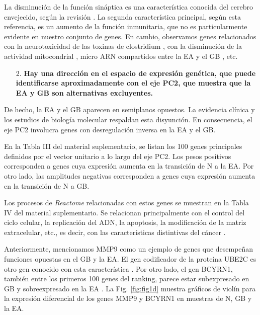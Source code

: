 La disminución de la función sináptica es una característica conocida del cerebro envejecido, según la revisión \cite{Ham_2020}. La segunda característica principal, según esta referencia, es un aumento de la función inmunitaria, que no es particularmente evidente en nuestro conjunto de genes. En cambio, observamos genes relacionados con la neurotoxicidad de las toxinas de clostridium \cite{Biazzo_2022}, con la disminución de la actividad mitocondrial \cite{Sun_2016}, micro ARN compartidos entre la EA y el GB \cite{Thomas_2020}, etc.

\begin{enumerate}
	\item[2.] \textbf{Hay una dirección en el espacio de expresión genética, que puede identificarse aproximadamente con el eje PC2, que muestra que la EA y GB son alternativas excluyentes.}
\end{enumerate}

De hecho, la EA y el GB aparecen en semiplanos opuestos. La evidencia clínica \cite{ou2012does, Driver_2012, Roe_2010, Musicco_2013} y los estudios de biología molecular \cite{Liu_2013, Lanni_2020} respaldan esta disyunción. En consecuencia, el eje PC2 involucra genes con desregulación inversa en la EA y el GB.

\alert{En la Tabla III del material suplementario}, se listan los 100 genes principales definidos por el vector unitario a lo largo del eje PC2. Los pesos positivos corresponden a genes cuya expresión aumenta en la transición de N a la EA. Por otro lado, las amplitudes negativas corresponden a genes cuya expresión aumenta en la transición de N a GB.

Los procesos de \textit{Reactome} relacionadas con estos genes se muestran en la \alert{Tabla IV del material suplementario}. Se relacionan principalmente con el control del ciclo celular, la replicación del ADN, la apoptosis, la modificación de la matriz extracelular, etc., es decir, con las características distintivas del cáncer \cite{Hanahan_2000, Hanahan_2011, Hanahan_2022}.

Anteriormente, mencionamos MMP9 como un ejemplo de genes que desempeñan funciones opuestas en el GB y la EA. El gen codificador de la proteína UBE2C es otro gen conocido con esta característica \cite{MA_2016, Jaladanki_2021}. Por otro lado, el gen BCYRN1, también entre los primeros 100 genes del ranking, parece estar subexpresado en GB \cite{Mu2021} y sobreexpresado en la EA \cite{Zhang_2021}. La Fig. \ref{fig:fig1d} muestra gráficos de violín para la expresión diferencial de los genes MMP9 y BCYRN1 en muestras de N, GB y la EA.

